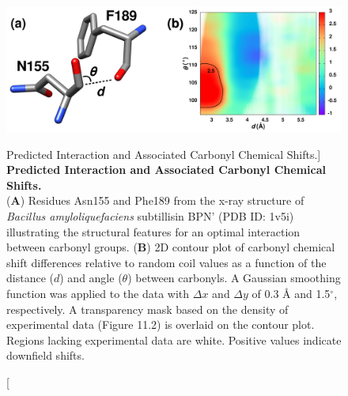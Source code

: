 \begin{figure}[ht!]
\includegraphics[width=6.5in]{figs/npistar/01-geometry.png}
\caption
      [Predicted \npistar{} Interaction and Associated Carbonyl \cnmr{}
       Chemical Shifts.]{
  {\bf Predicted \npistar{} Interaction and Associated Carbonyl \cnmr{}
       Chemical Shifts.
  }
  \\
  ({\bf A}) Residues Asn155 and Phe189 from the x-ray structure of
  \emph{Bacillus amyloliquefaciens} subtillisin BPN' (PDB ID: 1v5i)
  illustrating the structural features for an optimal \npistar{} interaction
  between carbonyl groups.
  ({\bf B}) 2D contour plot of carbonyl \cnmr{} chemical shift differences
  relative to random coil values as a function of the distance ($d$) and
  angle ($\theta$) between carbonyls. A Gaussian smoothing function was
  applied to the data with $\Delta x$ and $\Delta y$ of 0.3 \r{A} and
  1.5$^\circ$, respectively. A transparency mask based on the density of
  experimental data (Figure 11.2) is overlaid on the
  contour plot. Regions lacking experimental data are white.
  Positive values indicate downfield shifts.
}
\end{figure}

